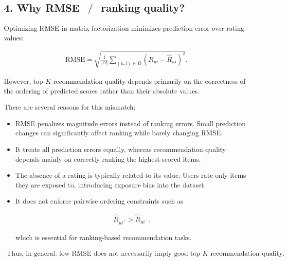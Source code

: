 \documentclass[11pt]{article}
\begin{document}
\begin{appendices}
\vspace{1cm}

\subsection*{4. Why RMSE $\neq$ ranking quality?}

Optimizing RMSE in matrix factorization minimizes prediction error over rating values:

\begin{align*}
\text{RMSE}
    =
    \sqrt{
    \frac{1}{|\Omega|}
    \sum_{(u,i)\in\Omega}
    (R_{ui}-\hat{R}_{ui})^2
    }.
\end{align*}

However, top-$K$ recommendation quality depends primarily on the correctness of the ordering of predicted scores rather than their absolute values.

There are several reasons for this mismatch:

\begin{itemize}

\item RMSE penalizes magnitude errors instead of ranking errors. Small prediction changes can significantly affect ranking while barely changing RMSE.

\item It treats all prediction errors equally, whereas recommendation quality depends mainly on correctly ranking the highest-scored items.

\item The absence of a rating is typically related to its value. Users rate only items they are exposed to, introducing exposure bias into the dataset.

\item It does not enforce pairwise ordering constraints such as

\begin{align*}
\hat{R}_{ui^+} > \hat{R}_{ui^-},
\end{align*}

which is essential for ranking-based recommendation tasks.

\end{itemize}
\begin{align*}
\text{Thus, in general, low RMSE does not necessarily imply good top-}K\text{ recommendation quality.}
\end{align*}


\vspace{1cm}


\end{appendices}
\end{document}
